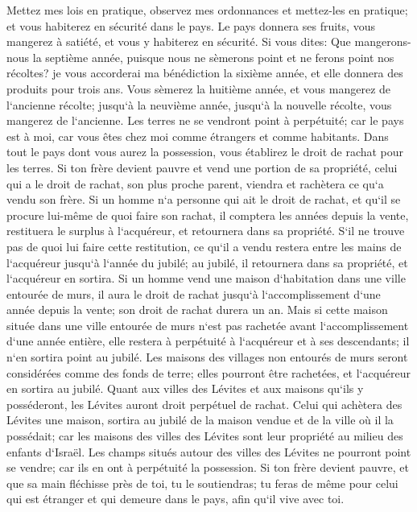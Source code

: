 \verse Mettez mes lois en pratique, observez mes ordonnances et mettez-les en pratique; et vous habiterez en sécurité dans le pays. 
\verse Le pays donnera ses fruits, vous mangerez à satiété, et vous y habiterez en sécurité. 
\verse Si vous dites: Que mangerons-nous la septième année, puisque nous ne sèmerons point et ne ferons point nos récoltes? 
\verse je vous accorderai ma bénédiction la sixième année, et elle donnera des produits pour trois ans. 
\verse Vous sèmerez la huitième année, et vous mangerez de l`ancienne récolte; jusqu`à la neuvième année, jusqu`à la nouvelle récolte, vous mangerez de l`ancienne. 
\verse Les terres ne se vendront point à perpétuité; car le pays est à moi, car vous êtes chez moi comme étrangers et comme habitants. 
\verse Dans tout le pays dont vous aurez la possession, vous établirez le droit de rachat pour les terres. 
\verse Si ton frère devient pauvre et vend une portion de sa propriété, celui qui a le droit de rachat, son plus proche parent, viendra et rachètera ce qu`a vendu son frère. 
\verse Si un homme n`a personne qui ait le droit de rachat, et qu`il se procure lui-même de quoi faire son rachat, 
\verse il comptera les années depuis la vente, restituera le surplus à l`acquéreur, et retournera dans sa propriété. 
\verse S`il ne trouve pas de quoi lui faire cette restitution, ce qu`il a vendu restera entre les mains de l`acquéreur jusqu`à l`année du jubilé; au jubilé, il retournera dans sa propriété, et l`acquéreur en sortira. 
\verse Si un homme vend une maison d`habitation dans une ville entourée de murs, il aura le droit de rachat jusqu`à l`accomplissement d`une année depuis la vente; son droit de rachat durera un an. 
\verse Mais si cette maison située dans une ville entourée de murs n`est pas rachetée avant l`accomplissement d`une année entière, elle restera à perpétuité à l`acquéreur et à ses descendants; il n`en sortira point au jubilé. 
\verse Les maisons des villages non entourés de murs seront considérées comme des fonds de terre; elles pourront être rachetées, et l`acquéreur en sortira au jubilé. 
\verse Quant aux villes des Lévites et aux maisons qu`ils y posséderont, les Lévites auront droit perpétuel de rachat. 
\verse Celui qui achètera des Lévites une maison, sortira au jubilé de la maison vendue et de la ville où il la possédait; car les maisons des villes des Lévites sont leur propriété au milieu des enfants d`Israël. 
\verse Les champs situés autour des villes des Lévites ne pourront point se vendre; car ils en ont à perpétuité la possession. 
\verse Si ton frère devient pauvre, et que sa main fléchisse près de toi, tu le soutiendras; tu feras de même pour celui qui est étranger et qui demeure dans le pays, afin qu`il vive avec toi. 
